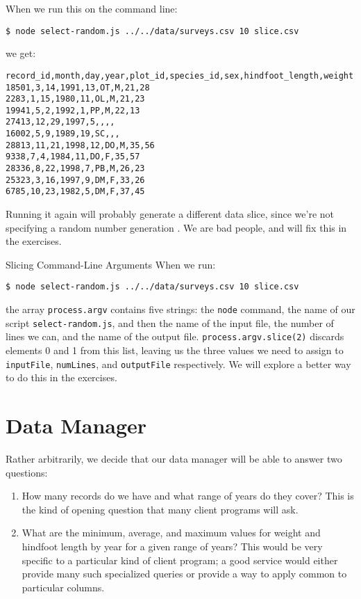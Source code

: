 When we run this on the command line:

\begin{verbatim}
$ node select-random.js ../../data/surveys.csv 10 slice.csv
\end{verbatim}

\noindent
we get:

\begin{verbatim}
record_id,month,day,year,plot_id,species_id,sex,hindfoot_length,weight
18501,3,14,1991,13,OT,M,21,28
2283,1,15,1980,11,OL,M,21,23
19941,5,2,1992,1,PP,M,22,13
27413,12,29,1997,5,,,,
16002,5,9,1989,19,SC,,,
28813,11,21,1998,12,DO,M,35,56
9338,7,4,1984,11,DO,F,35,57
28336,8,22,1998,7,PB,M,26,23
25323,3,16,1997,9,DM,F,33,26
6785,10,23,1982,5,DM,F,37,45
\end{verbatim}

Running it again will probably generate a different data slice,
since we're not specifying a random number generation .
We are bad people, and will fix this in the exercises.

\begin{aside}{Slicing Command-Line Arguments}
  When we run:

\begin{verbatim}
$ node select-random.js ../../data/surveys.csv 10 slice.csv
\end{verbatim}

  the array \texttt{process.argv} contains five strings:
  the \texttt{node} command,
  the name of our script \texttt{select-random.js},
  and then the name of the input file,
  the number of lines we can,
  and the name of the output file.
  \texttt{process.argv.slice(2)} discards elements 0 and 1 from this list,
  leaving us the three values we need to assign to \texttt{inputFile},
  \texttt{numLines},
  and \texttt{outputFile} respectively.
  We will explore a better way to do this in the exercises.
\end{aside}

\section{Data Manager}\label{s:dataman-manager}

Rather arbitrarily,
we decide that our data manager will be able to answer two questions:

\begin{enumerate}
\item
  How many records do we have and what range of years do they cover?
  This is the kind of opening question that many client programs will ask.
\item
  What are the minimum, average, and maximum values
  for weight and hindfoot length by year
  for a given range of years?
  This would be very specific to a particular kind of client program;
  a good service would either provide many such specialized queries
  or provide a way to apply common 
  to particular columns.
\end{enumerate}

